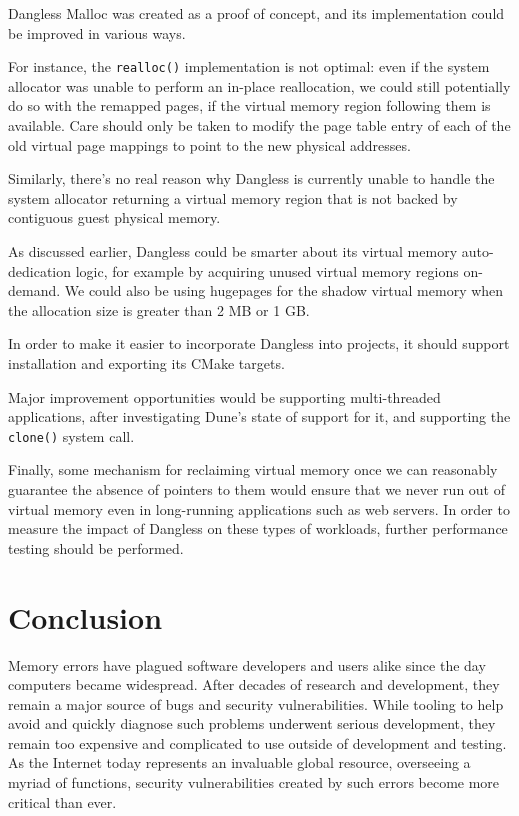 Dangless Malloc was created as a proof of concept, and its implementation could be improved in various ways.

For instance, the \lstinline!realloc()! implementation is not optimal: even if the system allocator was unable to perform an in-place reallocation, we could still potentially do so with the remapped pages, if the virtual memory region following them is available. Care should only be taken to modify the page table entry of each of the old virtual page mappings to point to the new physical addresses.

Similarly, there's no real reason why Dangless is currently unable to handle the system allocator returning a virtual memory region that is not backed by contiguous guest physical memory.

As discussed earlier, Dangless could be smarter about its virtual memory auto-dedication logic, for example by acquiring unused virtual memory regions on-demand. We could also be using hugepages for the shadow virtual memory when the allocation size is greater than 2 MB or 1 GB.

In order to make it easier to incorporate Dangless into projects, it should support installation and exporting its CMake targets.

Major improvement opportunities would be supporting multi-threaded applications, after investigating Dune's state of support for it, and supporting the \lstinline!clone()! system call.

Finally, some mechanism for reclaiming virtual memory once we can reasonably guarantee the absence of pointers to them would ensure that we never run out of virtual memory even in long-running applications such as web servers. In order to measure the impact of Dangless on these types of workloads, further performance testing should be performed.

\section{Conclusion}

Memory errors have plagued software developers and users alike since the day computers became widespread. After decades of research and development, they remain a major source of bugs and security vulnerabilities. While tooling to help avoid and quickly diagnose such problems underwent serious development, they remain too expensive and complicated to use outside of development and testing. As the Internet today represents an invaluable global resource, overseeing a myriad of functions, security vulnerabilities created by such errors become more critical than ever.


